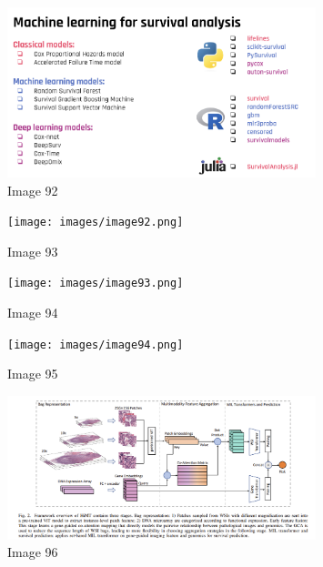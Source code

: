 \documentclass{article}%
\begin{document}
\begin{figure}[h!]%
\centering%
\includegraphics[width=0.8\textwidth]{images/image91.png}%
\caption{Image 92}%
\end{figure}

%


\begin{figure}[h!]%
\centering%
\texttt{[image: images/image92.png]}%
\caption{Image 93}%
\end{figure}

%


\begin{figure}[h!]%
\centering%
\texttt{[image: images/image93.png]}%
\caption{Image 94}%
\end{figure}

%


\begin{figure}[h!]%
\centering%
\texttt{[image: images/image94.png]}%
\caption{Image 95}%
\end{figure}

%


\begin{figure}[h!]%
\centering%
\includegraphics[width=0.8\textwidth]{images/image95.png}%
\caption{Image 96}%
\end{figure}

%
\end{document}
